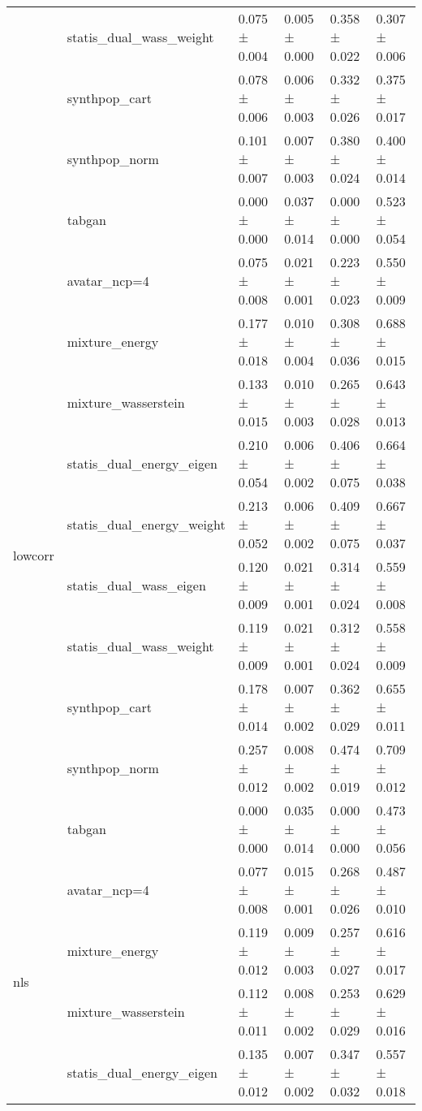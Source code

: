 \begin{tabular}{llllll}
 & statis_dual_wass_weight & 0.075 ± 0.004 & 0.005 ± 0.000 & 0.358 ± 0.022 & 0.307 ± 0.006 \\
 & synthpop_cart & 0.078 ± 0.006 & 0.006 ± 0.003 & 0.332 ± 0.026 & 0.375 ± 0.017 \\
 & synthpop_norm & \cellcolor{myred}0.101 ± 0.007 & 0.007 ± 0.003 & \cellcolor{myred}0.380 ± 0.024 & 0.400 ± 0.014 \\
 & tabgan & \cellcolor{mygreen}0.000 ± 0.000 & \cellcolor{myred}0.037 ± 0.014 & \cellcolor{mygreen}0.000 ± 0.000 & \cellcolor{myred}0.523 ± 0.054 \\
\cline{1-6}
\multirow[t]{10}{*}{lowcorr} & avatar_ncp=4 & 0.075 ± 0.008 & 0.021 ± 0.001 & 0.223 ± 0.023 & 0.550 ± 0.009 \\
 & mixture_energy & 0.177 ± 0.018 & 0.010 ± 0.004 & 0.308 ± 0.036 & 0.688 ± 0.015 \\
 & mixture_wasserstein & 0.133 ± 0.015 & 0.010 ± 0.003 & 0.265 ± 0.028 & 0.643 ± 0.013 \\
 & statis_dual_energy_eigen & 0.210 ± 0.054 & \cellcolor{mygreen}0.006 ± 0.002 & 0.406 ± 0.075 & 0.664 ± 0.038 \\
 & statis_dual_energy_weight & 0.213 ± 0.052 & \cellcolor{mygreen}0.006 ± 0.002 & 0.409 ± 0.075 & 0.667 ± 0.037 \\
 & statis_dual_wass_eigen & 0.120 ± 0.009 & 0.021 ± 0.001 & 0.314 ± 0.024 & 0.559 ± 0.008 \\
 & statis_dual_wass_weight & 0.119 ± 0.009 & 0.021 ± 0.001 & 0.312 ± 0.024 & 0.558 ± 0.009 \\
 & synthpop_cart & 0.178 ± 0.014 & 0.007 ± 0.002 & 0.362 ± 0.029 & 0.655 ± 0.011 \\
 & synthpop_norm & \cellcolor{myred}0.257 ± 0.012 & 0.008 ± 0.002 & \cellcolor{myred}0.474 ± 0.019 & \cellcolor{myred}0.709 ± 0.012 \\
 & tabgan & \cellcolor{mygreen}0.000 ± 0.000 & \cellcolor{myred}0.035 ± 0.014 & \cellcolor{mygreen}0.000 ± 0.000 & \cellcolor{mygreen}0.473 ± 0.056 \\
\cline{1-6}
\multirow[t]{10}{*}{nls} & avatar_ncp=4 & 0.077 ± 0.008 & 0.015 ± 0.001 & 0.268 ± 0.026 & \cellcolor{mygreen}0.487 ± 0.010 \\
 & mixture_energy & 0.119 ± 0.012 & 0.009 ± 0.003 & 0.257 ± 0.027 & 0.616 ± 0.017 \\
 & mixture_wasserstein & 0.112 ± 0.011 & 0.008 ± 0.002 & 0.253 ± 0.029 & 0.629 ± 0.016 \\
 & statis_dual_energy_eigen & 0.135 ± 0.012 & \cellcolor{mygreen}0.007 ± 0.002 & 0.347 ± 0.032 & 0.557 ± 0.018 \\

\end{tabular}
